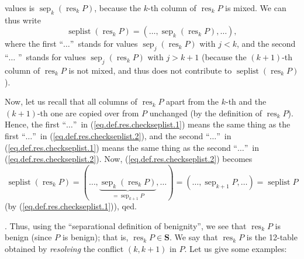 \documentclass[numbers=enddot,12pt,final,onecolumn,notitlepage]{scrartcl}%
\theoremstyle{definition}
\newenvironment{verlong}{}{}
\begin{document}
\begin{verlong}
{values is $\operatorname*{sep}\nolimits_{k}\left(  \operatorname*{res}%
\nolimits_{k}P\right)  $, because the $k$-th column of $\operatorname*{res}%
\nolimits_{k}P$ is mixed. We can thus write%
\begin{equation}
\operatorname*{seplist}\left(  \operatorname*{res}\nolimits_{k}P\right)
=\left(  \ldots,\operatorname*{sep}\nolimits_{k}\left(  \operatorname*{res}%
\nolimits_{k}P\right)  ,\ldots\right)  , \label{eq.def.res.checkseplist.2}%
\end{equation}
where the first \textquotedblleft$\ldots$\textquotedblright\ stands for values
$\operatorname*{sep}\nolimits_{j}\left(  \operatorname*{res}\nolimits_{k}%
P\right)  $ with $j<k$, and the second \textquotedblleft$\ldots$%
\textquotedblright\ stands for values $\operatorname*{sep}\nolimits_{j}\left(
\operatorname*{res}\nolimits_{k}P\right)  $ with $j>k+1$ (because the $\left(
k+1\right)  $-th column of $\operatorname*{res}\nolimits_{k}P$ is not mixed,
and thus does not contribute to $\operatorname*{seplist}\left(
\operatorname*{res}\nolimits_{k}P\right)  $).
\par
Now, let us recall that all columns of $\operatorname*{res}\nolimits_{k}P$
apart from the $k$-th and the $\left(  k+1\right)  $-th one are copied over
from $P$ unchanged (by the definition of $\operatorname*{res}\nolimits_{k}P$).
Hence, the first \textquotedblleft$\ldots$\textquotedblright\ in
(\ref{eq.def.res.checkseplist.1}) means the same thing as the first
\textquotedblleft$\ldots$\textquotedblright\ in
(\ref{eq.def.res.checkseplist.2}), and the second \textquotedblleft$\ldots
$\textquotedblright\ in (\ref{eq.def.res.checkseplist.1}) means the same thing
as the second \textquotedblleft$\ldots$\textquotedblright\ in
(\ref{eq.def.res.checkseplist.2}). Now, (\ref{eq.def.res.checkseplist.2})
becomes%
\[
\operatorname*{seplist}\left(  \operatorname*{res}\nolimits_{k}P\right)
=\left(  \ldots,\underbrace{\operatorname*{sep}\nolimits_{k}\left(
\operatorname*{res}\nolimits_{k}P\right)  }_{=\operatorname*{sep}%
\nolimits_{k+1}P},\ldots\right)  =\left(  \ldots,\operatorname*{sep}%
\nolimits_{k+1}P,\ldots\right)  =\operatorname*{seplist}P
\]
(by (\ref{eq.def.res.checkseplist.1})), qed.}. Thus, using the
\textquotedblleft separational definition of benignity\textquotedblright, we
see that $\operatorname*{res}\nolimits_{k}P$ is benign (since $P$ is benign);
that is, $\operatorname*{res}\nolimits_{k}P\in\mathbf{S}$. We say that
$\operatorname*{res}\nolimits_{k}P$ is the 12-table obtained by
\textit{resolving} the conflict $\left(  k,k+1\right)  $ in $P$. Let us give
some examples:


\end{verlong}
\end{document}

